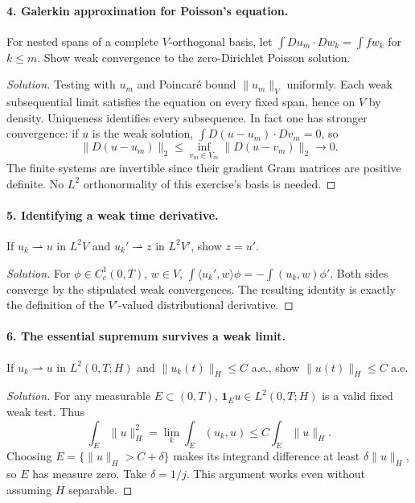 \Needspace{30mm}
\paragraph{4. Galerkin approximation for Poisson's equation.}
For nested spans of a complete $V$-orthogonal basis, let
$\int Du_m\cdot Dw_k=\int fw_k$ for $k\leq m$. Show weak convergence
to the zero-Dirichlet Poisson solution.
\begin{proof}[Solution]
Testing with $u_m$ and Poincar\'e bound $\|u_m\|_V$ uniformly.
Each weak subsequential limit satisfies the equation on every fixed span,
hence on $V$ by density. Uniqueness identifies every subsequence.
In fact one has stronger convergence: if $u$ is the weak solution,
$\int D(u-u_m)\cdot Dv_m=0$, so
\[
 \|D(u-u_m)\|_2\leq\inf_{v_m\in V_m}\|D(u-v_m)\|_2\longrightarrow0.
\]
The finite systems are invertible since their gradient Gram matrices are
positive definite. No $L^2$ orthonormality of this exercise's basis is needed.
\end{proof}

\Needspace{30mm}
\paragraph{5. Identifying a weak time derivative.}
If $u_k\rightharpoonup u$ in $L^2V$ and $u_k'\rightharpoonup z$ in
$L^2V'$, show $z=u'$.
\begin{proof}[Solution]
For $\phi\in C_c^1(0,T)$, $w\in V$,
$\int\langle u_k',w\rangle\phi=-\int(u_k,w)\phi'$.
Both sides converge by the stipulated weak convergences. The resulting
identity is exactly the definition of the $V'$-valued distributional derivative.
\end{proof}

\Needspace{30mm}
\paragraph{6. The essential supremum survives a weak limit.}
If $u_k\rightharpoonup u$ in $L^2(0,T;H)$ and
$\|u_k(t)\|_H\leq C$ a.e., show $\|u(t)\|_H\leq C$ a.e.
\begin{proof}[Solution]
For any measurable $E\subset(0,T)$, $\mathbf1_Eu\in L^2(0,T;H)$ is a
valid fixed weak test. Thus
\[
 \int_E\|u\|_H^2=\lim_k\int_E(u_k,u)\leq C\int_E\|u\|_H.
\]
Choosing $E=\{\|u\|_H>C+\delta\}$ makes its integrand difference at least
$\delta\|u\|_H$, so $E$ has measure zero. Take $\delta=1/j$.
This argument works even without assuming $H$ separable.
\end{proof}
\Needspace{55mm}

